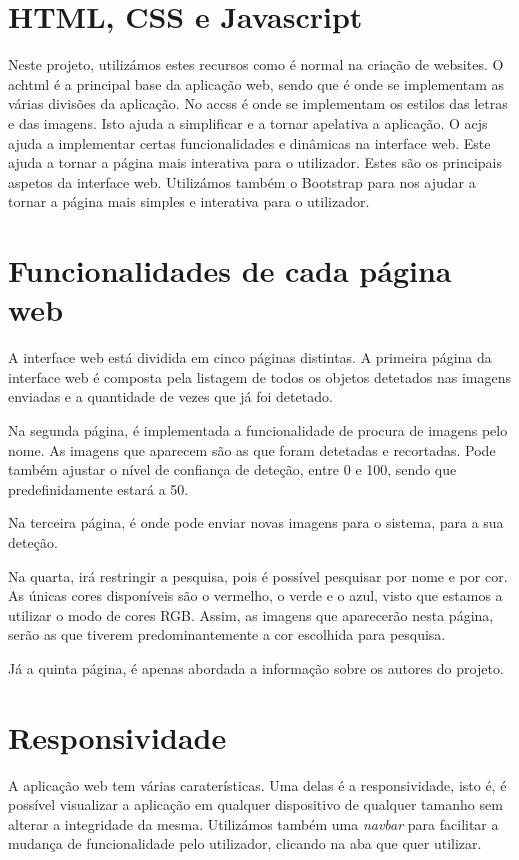 \documentclass{report}
\begin{document}
\section{HTML, CSS e Javascript}
Neste projeto, utilizámos estes recursos como é normal na criação de websites. O ac{html} é a principal base da aplicação web, sendo que é onde se implementam as várias divisões da aplicação. No ac{css} é onde se implementam os estilos das letras e das imagens. Isto ajuda a simplificar e a tornar apelativa a aplicação. O ac{js} ajuda a implementar certas funcionalidades e dinâmicas na interface web. Este ajuda a tornar a página mais interativa para o utilizador. Estes são os principais aspetos da interface web. Utilizámos também o Bootstrap para nos ajudar a tornar a página mais simples e interativa para o utilizador.

\section{Funcionalidades de cada página web}
A interface web está dividida em cinco páginas distintas. A primeira página da interface web é composta pela listagem de todos os objetos detetados nas imagens enviadas e a quantidade de vezes que já foi detetado.\par Na segunda página, é implementada a funcionalidade de procura de imagens pelo nome. As imagens que aparecem são as que foram detetadas e recortadas. Pode também ajustar o nível de confiança de deteção, entre 0 e 100, sendo que predefinidamente estará a 50. \par Na terceira página, é onde pode enviar novas imagens para o sistema, para a sua deteção. \par Na quarta, irá restringir a pesquisa, pois é possível pesquisar por nome e por cor. As únicas cores disponíveis são o vermelho, o verde e o azul, visto que estamos a utilizar o modo de cores RGB. Assim, as imagens que aparecerão nesta página, serão as que tiverem predominantemente a cor escolhida para pesquisa. \par Já a quinta página, é apenas abordada a informação sobre os autores do projeto.

\section{Responsividade}
A aplicação web tem várias caraterísticas. Uma delas é a responsividade, isto é, é possível visualizar a aplicação em qualquer dispositivo de qualquer tamanho sem alterar a integridade da mesma. Utilizámos também uma \textit{navbar} para facilitar a mudança de funcionalidade pelo utilizador, clicando na aba que quer utilizar.
\end{document}
